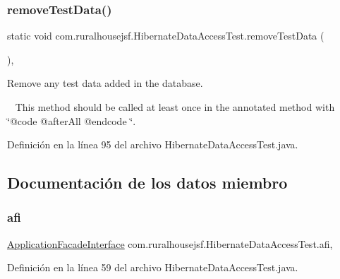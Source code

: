 \subsubsection{\texorpdfstring{removeTestData()}{removeTestData()}}
{\footnotesize\ttfamily static void com.\+ruralhousejsf.\+Hibernate\+Data\+Access\+Test.\+remove\+Test\+Data (\begin{DoxyParamCaption}{ }\end{DoxyParamCaption})\hspace{0.3cm}{\ttfamily [static]}, {\ttfamily [private]}}



Remove any test data added in the database. 

~\newline
 This method should be called at least once in the annotated method with \char`\"{}@code @after\+All @endcode \char`\"{}. 

Definición en la línea 95 del archivo Hibernate\+Data\+Access\+Test.\+java.



\subsection{Documentación de los datos miembro}
\mbox{\label{classcom_1_1ruralhousejsf_1_1_hibernate_data_access_test_a80a8ded7f2e12687541427d97fdbe29a}} 
\subsubsection{\texorpdfstring{afi}{afi}}
{\footnotesize\ttfamily \mbox{\hyperlink{interfacecom_1_1ruralhousejsf_1_1business_logic_1_1_application_facade_interface}{Application\+Facade\+Interface}} com.\+ruralhousejsf.\+Hibernate\+Data\+Access\+Test.\+afi\hspace{0.3cm}{\ttfamily [static]}, {\ttfamily [package]}}



Definición en la línea 59 del archivo Hibernate\+Data\+Access\+Test.\+java.

\mbox{\label{classcom_1_1ruralhousejsf_1_1_hibernate_data_access_test_ae42994f5a5d8bf916a38b64cda2788b1}} 
